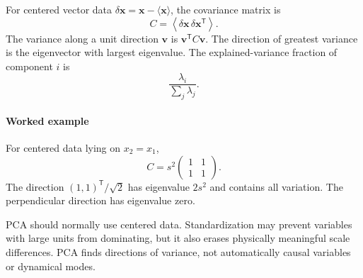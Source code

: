 For centered vector data $\delta\mathbf{x}=\mathbf{x}-\langle\mathbf{x}\rangle$, the covariance matrix is
\[
    C=\left\langle\delta\mathbf{x}\,\delta\mathbf{x}^{\mathsf T}\right\rangle.
\]
The variance along a unit direction $\mathbf{v}$ is $\mathbf{v}^{\mathsf T}C\mathbf{v}$.
The direction of greatest variance is the eigenvector with largest eigenvalue.
The explained-variance fraction of component $i$ is
\[
    \frac{\lambda_i}{\sum_j\lambda_j}.
\]

\paragraph{Worked example}
For centered data lying on $x_2=x_1$,
\[
    C=s^2\begin{pmatrix}1&1\\1&1\end{pmatrix}.
\]
The direction $(1,1)^{\mathsf T}/\sqrt{2}$ has eigenvalue $2s^2$ and contains all variation.
The perpendicular direction has eigenvalue zero.

PCA should normally use centered data.
Standardization may prevent variables with large units from dominating, but it also erases physically meaningful scale differences.
PCA finds directions of variance, not automatically causal variables or dynamical modes.


